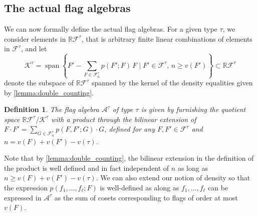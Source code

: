 \documentclass[a4paper,11pt]{article}
\newtheorem{definition}[theorem]{Definition}
\numberwithin{equation}{section}
\newcommand{\mA}{\mathcal{A}}
\newcommand{\mK}{\mathcal{K}}
\newcommand{\mF}{\mathcal{F}}
\newcommand{\mH}{\mathcal{H}}
\newcommand{\RR}{\mathbb{R}}
\begin{document}
\subsection{The actual flag algebras}

We can now formally define the actual flag algebras. For a given type $\tau$, we consider elements in $\RR \mF^\tau$, that is arbitrary finite linear combinations of elements in $\mF^\tau$, and let
%
\begin{equation}\label{eq:definition_of_kernel}
    \mK^\tau = \operatorname{span} \left\{ F'  - \sum_{F \in \mF^\tau_{ n}} p(F';F) \, F  \mid F' \in \mF^\tau, \, n \geq v(F') \right\} \subset \RR \mF^\tau
\end{equation}
%
denote the subspace of $\RR \mF^\tau$ spanned by the kernel of the density equalities given by \cref{lemma:double_counting}.
%
\begin{definition} \label{def:flagalgebra}
    The \emph{flag algebra $\mA^\tau$ of type $\tau$} is given by furnishing the quotient space $\mathbb R\mF^\tau / \mK^\tau$ with a product through the bilinear extension of $F \cdot F' = \sum_{G \in \mF^\tau_{ n}} p(F, F'; G) \cdot G$, defined for any $F, F' \in \mF^\tau$ and $n = v(F) + v(F') - v(\tau)$.
\end{definition}
%
Note that by \cref{lemma:double_counting}, the bilinear extension in the definition of the product is well defined and in fact independent of $n$ as long as $n \geq v(F) + v(F') - v(\tau)$. We can also extend our notion of density so that the expression $p(f_1,\dots,f_\ell;F)$ is well-defined as along as $f_1, \ldots, f_\ell$ can be expressed in $\mA^\tau$ as the sum of cosets corresponding to flags of order at most $v(F)$.

\end{document}
